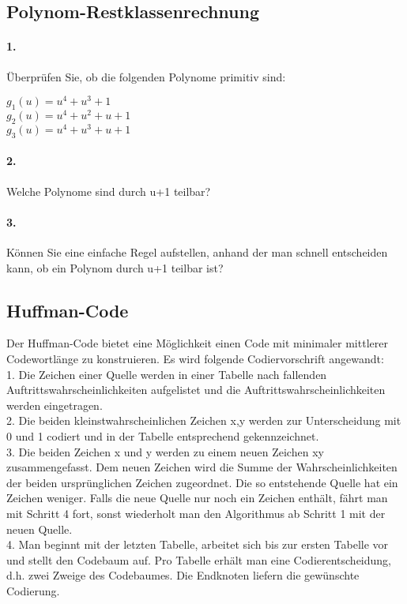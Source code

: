 \documentclass[paper=a4, fontsize=11pt]{scrartcl}
\numberwithin{equation}{section}
\numberwithin{figure}{section}
\numberwithin{table}{section}
\begin{document}
\subsection{Polynom-Restklassenrechnung}

\paragraph{1.}
Überprüfen Sie, ob die folgenden Polynome primitiv sind:

\begin{center}
$g_{1}(u)=u^{4}+u^{3}+1$ \\
$g_{2}(u)=u^{4}+u^{2}+u+1$ \\
$g_{3}(u)=u^{4}+u^{3}+u+1$ \\
\end{center}

\paragraph{2.}
Welche Polynome sind durch u+1 teilbar? \\

\paragraph{3.}
Können Sie eine einfache Regel aufstellen, anhand der man schnell entscheiden kann, ob ein Polynom durch u+1 teilbar ist? \\

\subsection{Huffman-Code}
Der Huffman-Code bietet eine Möglichkeit einen Code mit minimaler mittlerer Codewortlänge zu konstruieren. Es wird folgende Codiervorschrift angewandt: \\

1. Die Zeichen einer Quelle werden in einer Tabelle nach fallenden Auftrittswahrscheinlichkeiten aufgelistet und die Auftrittswahrscheinlichkeiten werden eingetragen. \\
2. Die beiden kleinstwahrscheinlichen Zeichen x,y werden zur Unterscheidung mit 0 und 1 codiert und in der Tabelle entsprechend gekennzeichnet. \\
3. Die beiden Zeichen x und y werden zu einem neuen Zeichen xy zusammengefasst. Dem neuen Zeichen wird die Summe der Wahrscheinlichkeiten der beiden ursprünglichen Zeichen zugeordnet. Die so entstehende Quelle hat ein Zeichen weniger. Falls die neue Quelle nur noch ein Zeichen enthält, fährt man mit Schritt 4 fort, sonst wiederholt man den Algorithmus ab Schritt 1 mit der neuen Quelle. \\
4. Man beginnt mit der letzten Tabelle, arbeitet sich bis zur ersten Tabelle vor und stellt den Codebaum auf. Pro Tabelle erhält man eine Codierentscheidung, d.h. zwei Zweige des Codebaumes. Die Endknoten liefern die gewünschte Codierung. \\
\end{document}
